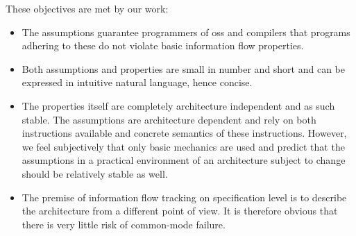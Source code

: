 These objectives are met by our work:
\begin{itemize}
    \item The assumptions guarantee programmers of \glspl{os} and compilers that programs adhering to these do not violate basic information flow properties.
    \item Both assumptions and properties are small in number and short and can be expressed in intuitive natural language, hence concise.
    \item The properties itself are completely architecture independent and as such stable.
    The assumptions are architecture dependent and rely on both instructions available and concrete semantics of these instructions.
    However, we feel subjectively that only basic mechanics are used and predict that the assumptions in a practical environment of an architecture subject to change should be relatively stable as well.
    \item The premise of information flow tracking on specification level is to describe the architecture from a different point of view.
    It is therefore obvious that there is very little risk of common-mode failure.
\end{itemize}

